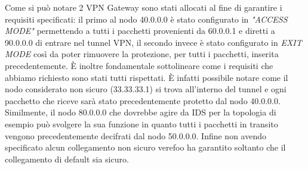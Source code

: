 Come si può notare 2 VPN Gateway sono stati allocati al fine di garantire i requisiti specificati: il primo al nodo 40.0.0.0
è stato configurato in \textit{"ACCESS MODE"} permettendo a tutti i pacchetti provenienti da 60.0.0.1 e diretti a 90.0.0.0 di entrare nel tunnel VPN, il
secondo invece è stato configurato in \textit{EXIT MODE} così da poter rimuovere la protezione, per tutti i pacchetti, inserita precedentemente. È inoltre fondamentale
sottolineare come i requisiti che abbiamo richiesto sono stati tutti rispettati. È infatti possibile notare come il nodo considerato non sicuro (33.33.33.1) si trova all'interno del tunnel e ogni
pacchetto che riceve sarà stato precedentemente protetto dal nodo 40.0.0.0. Similmente, il nodo 80.0.0.0 che dovrebbe agire da IDS per la topologia di esempio può svolgere la sua funzione in quanto
tutti i pacchetti in transito vengono precedentemente decifrati dal nodo 50.0.0.0. Infine non avendo specificato alcun collegamento non sicuro verefoo ha garantito soltanto che il collegamento di default
sia sicuro.

